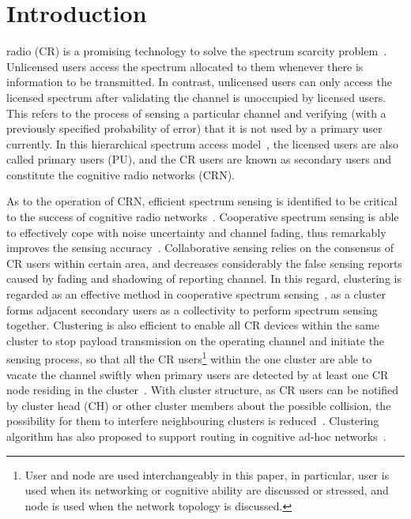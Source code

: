 \documentclass[10pt,journal,compsoc]{IEEEtran}
\theoremstyle{mytheoremstyle}
\theoremstyle{mytheoremstyle}
\theoremstyle{mytheoremstyle}
\begin{document}
\graphicspath{
{/home/di/work/thesis/thesisTemplate/figures/04_clutering/}
}


\section{Introduction}
\label{intro}
 radio (CR) is a promising technology to solve the spectrum scarcity problem~\cite{Mitola}.
Unlicensed users access the spectrum allocated to them whenever there is information to be transmitted.
In contrast, unlicensed users can only access the licensed spectrum after validating the channel is unoccupied by licensed users.
This refers to the process of sensing a particular channel and verifying (with a previously specified probability of error) that it is not used by a primary user currently.
In this hierarchical spectrum access model~\cite{zhao_survey_DSA_2007}, the licensed users are also called primary users (PU), and the CR users are known as secondary users and constitute the cognitive radio networks (CRN).

As to the operation of CRN, efficient spectrum sensing is identified to be critical to the success of cognitive radio networks~\cite{Sahai_FundamentalDesignTradeoffs2006}.
Cooperative spectrum sensing is able to effectively cope with noise uncertainty and channel fading, thus remarkably improves the sensing accuracy~\cite{coorperativeSensing_Akyildiz11}.
Collaborative sensing relies on the consensus of CR users within certain area, and decreases considerably the false sensing reports caused by fading and shadowing of reporting channel.
In this regard, clustering is regarded as an effective method in cooperative spectrum sensing~\cite{Sun07_clustering_spectrum_secsing, Zhao07}, as a cluster forms adjacent secondary users as a collectivity to perform spectrum sensing together.
Clustering is also efficient to enable all CR devices within the same cluster to stop payload transmission on the operating channel and initiate the sensing process, so that all the CR users\footnote{User and node are used interchangeably in this paper, in particular, user is used when its networking or cognitive ability are discussed or stressed, and node is used when the network topology is discussed.} within the one cluster are able to vacate the channel swiftly when primary users are detected by at least one CR node residing in the cluster~\cite{willkomm08}.
With cluster structure, as CR users can be notified by cluster head (CH) or other cluster members about the possible collision, the possibility for them to interfere neighbouring clusters is reduced~\cite{centralizedSharing80222}. 
Clustering algorithm has also proposed to support routing in cognitive ad-hoc networks~\cite{Abbasi_survey_07}.
\end{document}
